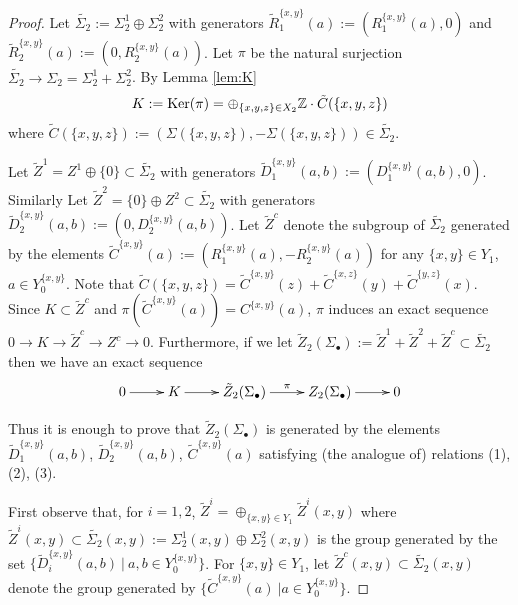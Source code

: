\documentclass[12pt]{amsart}
\theoremstyle{definition}
\newcommand{\Z}{\Bbb{Z}}
\newcommand{\<}{\langle}
\renewcommand{\>}{\rangle}
\renewcommand{\ker}[1]{\mathrm{Ker}(#1)}
\begin{document}
\begin{proof}  Let $\widetilde{\Sigma_2}:=\Sigma_2^1\oplus \Sigma_2^2$ with generators $\tilde{R}^{\{ x,y\}}_1(a):=(R^{\{ x,y\}}_1(a),0)$ and 
$\tilde{R}^{\{ x,y\}}_2(a):=(0,R^{\{ x,y\}}_2(a))$. Let $\pi$ be the natural surjection $\widetilde{\Sigma_2}\to \Sigma_2=\Sigma_2^1+\Sigma_2^2$. 
By Lemma \ref{lem:K} 
\[
K:=\ker{\pi}=\oplus_{\{x,y,z\}\in X_2}\Z\cdot \tilde{C}(\{ x,y,z\})
\]
where $\tilde{C}(\{ x,y,z\}):=(\Sigma(\{ x,y,z\}),-\Sigma(\{ x,y,z\}))\in \widetilde{\Sigma_2}$.

 Let $\tilde{Z}^1=Z^1\oplus \{ 0\}\subset \widetilde{\Sigma_2}$
with generators $\tilde{D}_1^{\{ x,y\}}(a,b):= (D_1^{\{ x,y\}}(a,b),0)$. Similarly 
 Let $\tilde{Z}^2=\{ 0\} \oplus Z^2\subset \widetilde{\Sigma_2}$
 with generators $\tilde{D}_2^{\{ x,y\}}(a,b):= (0, D_2^{\{ x,y\}}(a,b))$. Let $\tilde{Z}^c$ denote the subgroup of $\widetilde{\Sigma_2}$ generated by 
the elements $\tilde{C}^{\{ x,y\}}(a):=(R_1^{\{ x,y\}}(a),-R_2^{\{ x,y\}}(a))$ for any $\{ x,y\}\in Y_1$, $a\in Y^{\{ x,y\}}_0$.
 Note that $\tilde{C}(\{ x,y,z\})= \tilde{C}^{\{ x,y\}}(z)+\tilde{C}^{\{ x,z\}}(y)+\tilde{C}^{\{ y,z\}}(x)$. Since $K\subset \tilde{Z}^c$ and $\pi(\tilde{C}^{\{ x,y\}}(a))={C}^{\{ x,y\}}(a)$, $\pi$ induces 
an exact sequence $0\to K\to \tilde{Z}^c\to Z^c\to 0$. Furthermore, if we let $\tilde{Z}_2(\Sigma_\bullet):=\tilde{Z}^1+\tilde{Z}^2+\tilde{Z}^c\subset \widetilde{\Sigma_2}$ then we have an exact sequence
\[
\xymatrix{
0\ar[r]&K\ar[r]& \tilde{Z}_2(\Sigma_\bullet)\ar^-{\pi}[r]&Z_2(\Sigma_\bullet)\ar[r]&0\\
}
\]

Thus it is enough to prove that $\tilde{Z}_2(\Sigma_\bullet)$ is generated by the elements  $\tilde{D}_1^{\{ x,y\}}(a,b)$, $\tilde{D}_2^{\{ x,y\}}(a,b)$, $\tilde{C}^{\{ x,y\}}(a)$ satisfying (the analogue of) relations (1), (2), (3).

 First observe that, for $i=1,2$, $\tilde{Z}^i=\oplus_{\{ x,y\}\in Y_1}\tilde{Z}^i(x,y)$ where $\tilde{Z}^i(x,y) \subset \widetilde{\Sigma_2}(x,y):= \Sigma_2^1(x,y)\oplus \Sigma_2^2(x,y)$ is the group generated by the set 
 $\{\tilde{D}_i^{\{ x,y\}}(a,b)\ |\ a,b\in Y^{\{ x,y\}}_0\}$. 
 For $\{ x,y\}\in Y_1$, let $\tilde{Z}^c(x,y)\subset \widetilde{\Sigma_2}(x,y)$ denote the group generated by
$\{ \tilde{C}^{\{ x,y\}}(a)\ |  a\in Y^{\{ x,y\}}_0\}$.


\end{proof}
\end{document}
